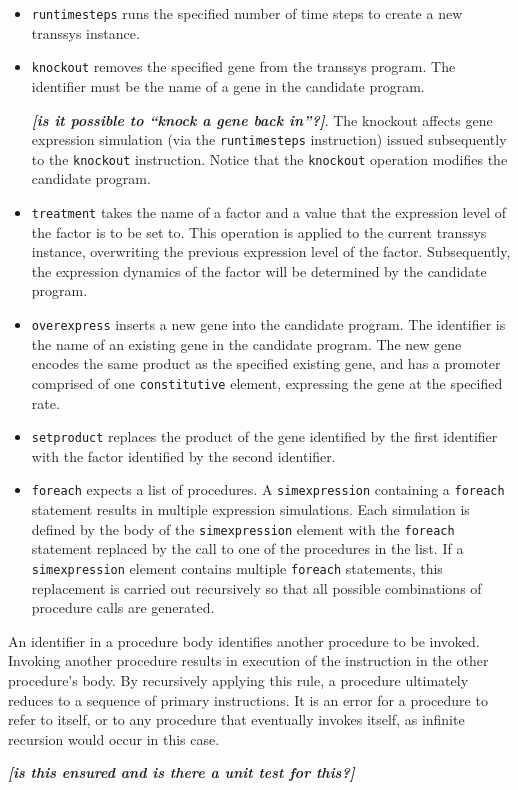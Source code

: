 \documentclass[a4paper,fleqn]{article}
\newcommand{\computercode}[1]{\texttt{#1}}
\newcommand{\todo}[1]{\rule{0pt}{0pt}\marginpar{\rule{1ex}{1ex}}\textbf{\emph{[#1]}}}
\begin{document}
\begin{itemize}
\item \computercode{runtimesteps} runs the specified number of time
  steps to create a new transsys instance.
\item \computercode{knockout} removes the specified gene from the
  transsys program. The identifier must be the name of a gene in the
  candidate program. \todo{is it possible to ``knock a gene back
    in''?}. The knockout affects gene expression simulation (via the
  \computercode{runtimesteps} instruction) issued subsequently to the
  \computercode{knockout} instruction. Notice that the
  \computercode{knockout} operation modifies the candidate program.
\item \computercode{treatment} takes the name of a factor and a value
  that the expression level of the factor is to be set to. This
  operation is applied to the current transsys instance, overwriting
  the previous expression level of the factor. Subsequently, the
  expression dynamics of the factor will be determined by the
  candidate program.
\item \computercode{overexpress} inserts a new gene into the candidate
  program. The identifier is the name of an existing gene in the
  candidate program. The new gene encodes the same product as the
  specified existing gene, and has a promoter comprised of one
  \computercode{constitutive} element, expressing the gene at the
  specified rate.
\item \computercode{setproduct} replaces the product of the gene
  identified by the first identifier with the factor identified by the
  second identifier.
\item \computercode{foreach} expects a list of procedures. A
  \computercode{simexpression} containing a \computercode{foreach}
  statement results in multiple expression simulations. Each simulation
  is defined by the body of the \computercode{simexpression} element
  with the \computercode{foreach} statement replaced by the call to
  one of the procedures in the list. If a \computercode{simexpression}
  element contains multiple \computercode{foreach} statements, this
  replacement is carried out recursively so that all possible
  combinations of procedure calls are generated.
\end{itemize}
An identifier in a procedure body identifies another procedure to be
invoked. Invoking another procedure results in execution of the
instruction in the other procedure's body. By recursively applying
this rule, a procedure ultimately reduces to a sequence of primary
instructions.  It is an error for a procedure to refer to itself, or
to any procedure that eventually invokes itself, as infinite recursion
would occur in this case. \todo{is this ensured and is there a unit
  test for this?}
\end{document}
